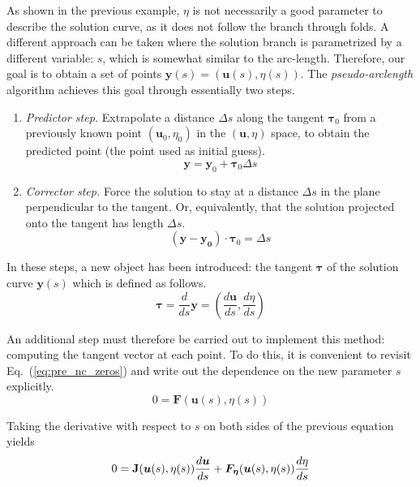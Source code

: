 As shown in the previous example, $\eta$ is not necessarily a good parameter to describe
the solution curve, as it does not follow the branch through folds. 
A different approach can be taken where the solution branch is parametrized
by a different variable: $s$, which is somewhat similar
to the arc-length. Therefore, our goal is to obtain a set of points 
$\bm{y}(s) = (\bm{u}(s), \eta(s))$.
The {\em pseudo-arclength} algorithm \cite{keller1977numerical} achieves this goal
through essentially two steps.
\begin{enumerate}
    \item {\em Predictor step.} Extrapolate a distance $\Delta s$ along the tangent $\bm{\tau}_0$ from a previously known point $(\bm{u}_0, \eta_0)$ in the $(\bm{u},\eta)$ space, to
    obtain the predicted point (the point used as initial guess). 
    $$\bm{y} = \bm{y}_0 + \bm{\tau}_0 \Delta s$$
    \item {\em Corrector step.} Force the solution to stay at a distance $\Delta s$ in the plane perpendicular to the tangent. 
    Or, equivalently, that the solution projected onto the tangent has length $\Delta s$. 
    $$(\bm{y} - \bm{y_0}) \cdot \bm{\tau}_0 = \Delta s$$
\end{enumerate}

In these steps, a new object has been introduced: the tangent $\bm{\tau}$ 
of the solution curve $\bm{y}(s)$ which is defined as follows.
\begin{equation}
    \bm{\tau} = \frac{d}{ds}\bm{y} = \left(\frac{d\bm{u}}{ds}, \frac{d\eta}{ds}\right)
\end{equation}

An additional step must therefore be carried out to implement this method: 
computing the tangent vector at each point. To do this, it is convenient to revisit 
Eq.~(\ref{eq:pre_nc_zeros}) and write out the dependence on the new 
parameter $s$ explicitly.
\begin{equation}
    0 = \bm{F}(\bm{u}(s), \eta (s))
\end{equation}

Taking the derivative with respect to $s$ on both sides of the
previous equation yields
\begin{equation}
    0 = \mathbf{J}(\bm{u}(s), \eta (s)) \frac{d \bm{u}}{ds} 
            + \bm{F_\eta}(\bm{u}(s), \eta (s)) \frac{d\eta}{ds}
    \label{eq:pre_nc_tangent}
\end{equation}

